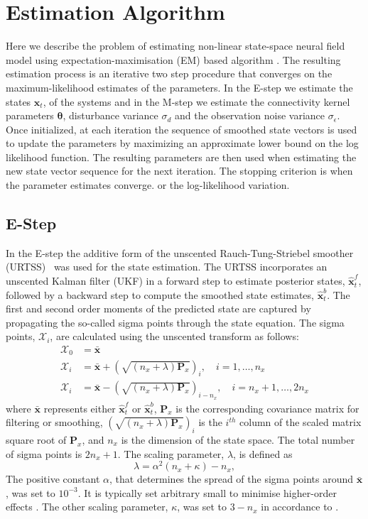 \documentclass[]{article}
\begin{document}
\section{Estimation Algorithm}
Here we describe the problem of estimating non-linear state-space neural field model using expectation-maximisation (EM) based algorithm \cite{Dempster1977,Shumway2000}. The resulting estimation process is an iterative two step procedure that converges on the maximum-likelihood estimates of the parameters. In the E-step we estimate the states $\mathbf x_t$, of the systems and in the M-step we estimate the connectivity kernel parameters $\boldsymbol \theta$, disturbance variance $\sigma_d$ and the observation noise variance $\sigma_{\epsilon}$. Once initialized, at each iteration the sequence of smoothed state vectors is used to update the parameters by maximizing an approximate lower bound on the log likelihood function. The resulting parameters are then used when estimating the new
state vector sequence for the next iteration. The stopping criterion is when the parameter estimates converge. or the log-likelihood variation.
\subsection{E-Step}
In the E-step the additive form of the unscented Rauch-Tung-Striebel smoother (URTSS)~\cite{Sarkka2010} was used for the state estimation. The URTSS incorporates an unscented Kalman filter (UKF) \cite{Julier1997, Merwe2003} in a forward step to estimate posterior states, $\hat{\mathbf x}_t^{f}$, followed by a backward step to compute the smoothed state estimates, $\hat{\mathbf x}_t^{b}$. The first and second order moments of the predicted state are captured by propagating the so-called sigma points through the state equation. The sigma points, $\mathcal X_i$, are calculated using the unscented transform as follows:
\begin{align}\label{eq:sigmapoints1}
	\mathcal X_{0}&=\mathbf{\bar x} \\
	\mathcal X_{i}&= \mathbf{\bar x}+\left(\sqrt{( n_x + \lambda)\mathbf P_x}\right)_i, \quad i=1, \dots, n_x \\
	\mathcal X_{i}&=\mathbf{\bar x}-\left(\sqrt{( n_x + \lambda)\mathbf P_x}\right)_{i- n_x}, \quad i= n_x+1, \dots, 2n_x 
\end{align}
where $\mathbf{\bar x}$ represents either $\hat{\mathbf x}_t^{f}$ or $\hat{\mathbf x}_t^{b}$, $\mathbf{P}_x$ is the corresponding covariance matrix for filtering or smoothing, $\left(\sqrt{( n_x + \lambda)\mathbf P_x}\right)_i$ is the $i^{th}$ column of the scaled matrix square root of $\mathbf P_x$, and $n_x$ is the dimension of the state space. The total number of sigma points is $2n_x+1$. The scaling parameter, $\lambda$, is defined as 
\begin{equation}\label{eq:sigmapoints3}
	\lambda=\alpha^2( n_x+\kappa) - n_x, 
\end{equation}
The positive constant $\alpha$, that determines the spread of the sigma points around $\mathbf{\bar x}$, was set to $10^{-3}$. It is typically set arbitrary small to minimise higher-order effects \cite{Haykin2001}. The other scaling parameter, $\kappa$, was set to $3-n_x$ in accordance to \cite{Julier2002a}.
\end{document}
